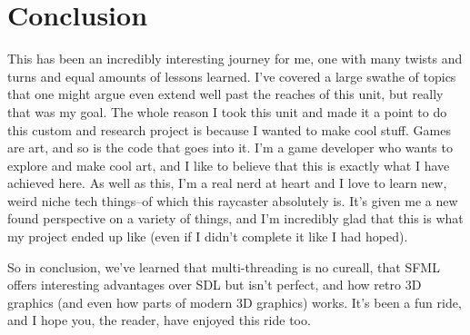 \documentclass{article}
\begin{document}
\section{Conclusion}
This has been an incredibly interesting journey for me, one with many twists and
turns and equal amounts of lessons learned. I've covered a large swathe of
topics that one might argue even extend well past the reaches of this unit, but
really that was my goal. The whole reason I took this unit and made it a point
to do this custom and research project is because I wanted to make cool stuff.
Games are art, and so is the code that goes into it. I'm a game developer who
wants to explore and make cool art, and I like to believe that this is exactly
what I have achieved here. As well as this, I'm a real nerd at heart and I love
to learn new, weird niche tech things--of which this raycaster absolutely is.
It's given me a new found perspective on a variety of things, and I'm incredibly
glad that this is what my project ended up like (even if I didn't complete it
like I had hoped).

So in conclusion, we've learned that multi-threading is no cureall, that SFML
offers interesting advantages over SDL but isn't perfect, and how retro 3D
graphics (and even how parts of modern 3D graphics) works. It's been a fun ride,
and I hope you, the reader, have enjoyed this ride too.
\end{document}
